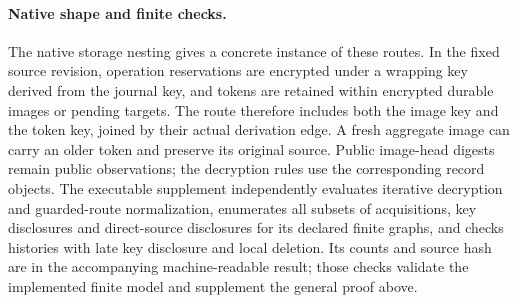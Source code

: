 \paragraph{Native shape and finite checks.}
The native storage nesting gives a concrete instance of these routes.
In the fixed source revision, operation reservations are encrypted under
a wrapping key derived from the journal key, and tokens are retained
within encrypted durable images or pending targets. The route therefore
includes both the image key and the token key, joined by their actual
derivation edge. A fresh aggregate image can carry an older token and
preserve its original source. Public image-head digests remain public
observations; the decryption rules use the corresponding record objects.
The executable supplement independently evaluates iterative decryption
and guarded-route normalization, enumerates all subsets of acquisitions,
key disclosures and direct-source disclosures for its declared finite graphs,
and checks histories with late
key disclosure and local deletion.  Its counts and source hash are in
the accompanying machine-readable result; those checks validate the
implemented finite model and supplement the general proof above.
